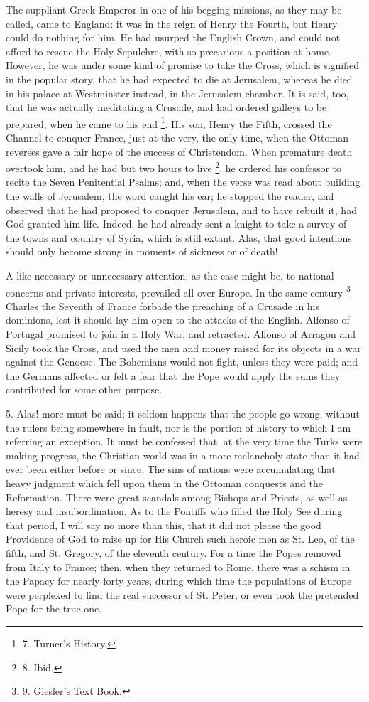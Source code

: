 The suppliant Greek Emperor in
one of his begging missions, as they may be called, came to England:
it was in the reign of Henry the Fourth, but Henry could do nothing
for him. He had usurped the English Crown, and could not afford to
rescue the Holy Sepulchre, with so precarious a position at home.
However, he was under some kind of promise to take the Cross, which is
signified in the popular story, that he had expected to die at
Jerusalem, whereas he died in his palace at Westminster instead, in
the Jerusalem chamber. It is said, too, that he was actually
meditating a Crusade, and had ordered galleys to be prepared, when he
came to his end \footnote{7.
Turner's History.}. His son,
Henry the Fifth, crossed the Channel to conquer France, just at the
very, the only time, when the Ottoman reverses gave a fair hope of the
success of Christendom. When premature death overtook him, and he had
but two hours to live \footnote{8.
Ibid.}, he
ordered his confessor to recite the Seven Penitential Psalms; and,
when the verse was read about building the walls of Jerusalem, the
word caught his ear; he stopped the reader, and observed that he
had proposed to conquer Jerusalem, and to have rebuilt it, had God
granted him life. Indeed, he had already sent a knight to take a
survey of the towns and country of Syria, which is still extant. Alas,
that good intentions should only become strong in moments of sickness
or of death!

A like necessary or
unnecessary attention, as the case might be, to national concerns and
private interests, prevailed all over Europe. In the same century \footnote{9.
Giesler's Text Book.} Charles the Seventh of France forbade the preaching of a
Crusade in his dominions, lest it should lay him open to the attacks
of the English. Alfonso of Portugal promised to join in a Holy War,
and retracted. Alfonso of Arragon and Sicily took the Cross, and used
the men and money raised for its objects in a war against the Genoese.
The Bohemians would not fight, unless they were paid; and the Germans
affected or felt a fear that the Pope would apply the sums they
contributed for some other purpose.

5. Alas! more must be said; it
seldom happens that the people go wrong, without the rulers being
somewhere in fault, nor is the portion of history to which I am
referring an exception. It must be confessed that, at the very time
the Turks were making progress, the Christian world was in a more
melancholy state than it had ever been either before or since. The
sins of nations were accumulating that heavy judgment which fell upon
them in the Ottoman conquests and the Reformation. There were great
scandals among Bishops and Priests, as well as heresy and
insubordination. As to the Pontiffs who filled the Holy See during
that period, I will say no more than this, that it did not please the
good Providence of God to raise up for His Church such heroic
men as St. Leo, of the fifth, and St. Gregory, of the eleventh
century. For a time the Popes removed from Italy to France; then, when
they returned to Rome, there was a schism in the Papacy for nearly
forty years, during which time the populations of Europe were
perplexed to find the real successor of St. Peter, or even took the
pretended Pope for the true one.

